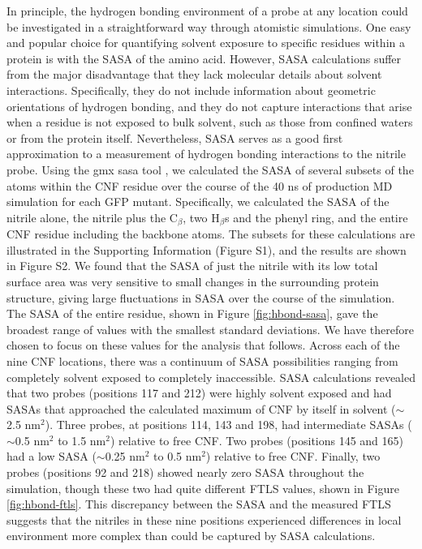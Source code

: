 In principle, the hydrogen bonding environment of a probe at any location could be investigated in a straightforward way through atomistic simulations.
One easy and popular choice for quantifying solvent exposure to specific residues within a protein is with the SASA of the amino acid.
However, SASA calculations suffer from the major disadvantage that they lack molecular details about solvent interactions.
Specifically, they do not include information about geometric orientations of hydrogen bonding, and they do not capture interactions that arise when a residue is not exposed to bulk solvent, such as those from confined waters or from the protein itself.
Nevertheless, SASA serves as a good first approximation to a measurement of hydrogen bonding interactions to the nitrile probe.  
Using the gmx sasa tool \cite{Eisenhaber1995}, we calculated the SASA of several subsets of the atoms within the CNF residue over the course of the 40 ns of production MD simulation for each GFP mutant. 
Specifically, we calculated the SASA of the nitrile alone, the nitrile plus the C$_{\beta}$, two H$_{\beta}$s and the phenyl ring, and the entire CNF residue including the backbone atoms.
The subsets for these calculations are illustrated in the Supporting Information (Figure S1), and the results are shown in Figure S2.
We found that the SASA of just the nitrile with its low total surface area was very sensitive to small changes in the surrounding protein structure, giving large fluctuations in SASA over the course of the simulation.
The SASA of the entire residue, shown in Figure \ref{fig:hbond-sasa}, gave the broadest range of values with the smallest standard deviations.
We have therefore chosen to focus on these values for the analysis that follows.
Across each of the nine CNF locations, there was a continuum of SASA possibilities ranging from completely solvent exposed to completely inaccessible.
SASA calculations revealed that two probes (positions 117 and 212) were highly solvent exposed and had SASAs that approached the calculated maximum of CNF by itself in solvent ($\sim$2.5 nm$^2$).
Three probes, at positions 114, 143 and 198, had intermediate SASAs ($\sim$0.5 nm$^2$ to 1.5 nm$^2$) relative to free CNF.
Two probes (positions 145 and 165) had a low SASA ($\sim$0.25 nm$^2$ to 0.5 nm$^2$) relative to free CNF.
Finally, two probes (positions 92 and 218) showed nearly zero SASA throughout the simulation, though these two had quite different FTLS values, shown in Figure \ref{fig:hbond-ftls}.
This discrepancy between the SASA and the measured FTLS suggests that the nitriles in these nine positions experienced differences in local environment more complex than could be captured by SASA calculations.

